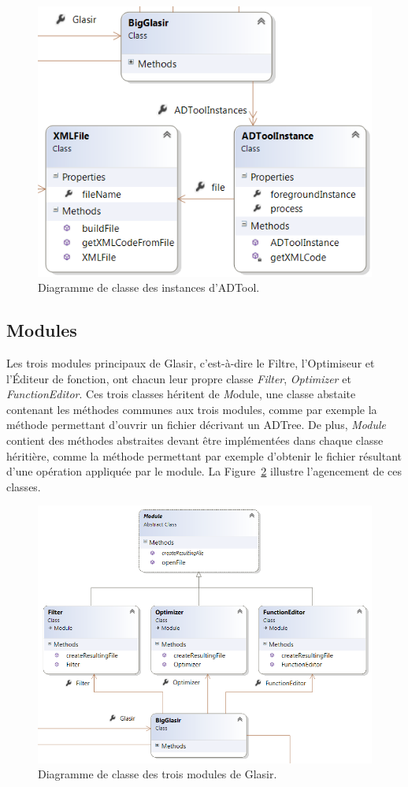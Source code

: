     	
    	\begin{figure}[H]
	        \centering
	        \includegraphics[height=0.5\textwidth]{figure/adtoolinstance.png}
	        \caption{Diagramme de classe des instances d'ADTool.}
	        \label{fig:instADT}
	    \end{figure}
	    


	\subsection{Modules}
    	\label{sec:diagClassMod}    	
    	
    	 Les trois modules principaux de Glasir, c'est-à-dire le Filtre, l'Optimiseur et l'Éditeur de fonction, ont chacun leur propre classe \emph{Filter}, \emph{Optimizer} et \emph{FunctionEditor}. Ces trois classes héritent de {\emph Module}, une classe abstaite contenant les méthodes communes aux trois modules, comme par exemple la méthode permettant d'ouvrir un fichier décrivant un ADTree. De plus, \emph{Module} contient des méthodes abstraites devant être implémentées dans chaque classe héritière, comme la méthode permettant par exemple d'obtenir le fichier résultant d'une opération appliquée par le module. La {\sc Figure}~\ref{fig:mod} illustre l'agencement de ces classes.
    	
    	
    	\begin{figure}[H]
	        \centering
	        \includegraphics[height=0.7\textwidth]{figure/modules.png}
	        \caption{Diagramme de classe des trois modules de Glasir.}
	        \label{fig:mod}
	    \end{figure}
	    
